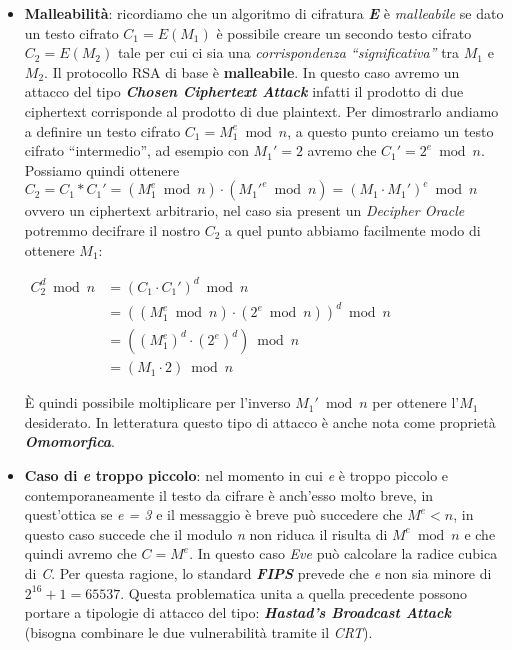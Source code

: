 \begin{itemize}
    
    \item \textbf{Malleabilità}: ricordiamo che un algoritmo di cifratura \textbf{\textit{E}} è \textit{malleabile} se dato un testo cifrato $C_1 = E(M_1)$ è possibile creare un secondo testo cifrato $C_2 = E(M_2)$ tale per cui ci sia una \textit{corrispondenza ``significativa''} tra $M_1$ e $M_2$. Il protocollo RSA di base è \textbf{malleabile}. In questo caso avremo un attacco del tipo \textbf{\textit{Chosen Ciphertext Attack}} infatti il prodotto di due ciphertext corrisponde al prodotto di due plaintext. Per dimostrarlo andiamo a definire un testo cifrato $C_1 = M_1^e \bmod n$, a questo punto creiamo un testo cifrato ``intermedio'', ad esempio con $M_1' = 2$ avremo che $C_1' = 2^e \bmod n$. Possiamo quindi ottenere $C_2 = C_1 * C_1' = (M_1^e \bmod n) \cdot (M_1'^e \bmod n) = (M_1 \cdot M_1')^e \bmod n$ ovvero un ciphertext arbitrario, nel caso sia present un \textit{Decipher Oracle} potremmo decifrare il nostro $C_2$ a quel punto abbiamo facilmente modo di ottenere $M_1$:
    \begin{center}
        \begin{math}
            \begin{aligned}
            C_2^d \bmod n &= (C_1 \cdot C_1')^d \bmod n \\
            &= ((M_1^e \bmod n) \cdot (2^e \bmod n))^d \bmod n \\
            &= ((M_1^e)^d \cdot (2^e)^d) \bmod n \\
            &= (M_1 \cdot 2) \bmod n
            \end{aligned}    
        \end{math}    
    \end{center}
    È quindi possibile moltiplicare per l'inverso $M_1' \bmod n$ per ottenere l'$M_1$ desiderato. In letteratura questo tipo di attacco è anche nota come proprietà \textbf{\textit{Omomorfica}}.

    \item \textbf{Caso di \textit{e} troppo piccolo}: nel momento in cui \textit{e} è troppo piccolo e contemporaneamente il testo da cifrare è anch'esso molto breve, in quest'ottica se \textit{e = 3} e il messaggio è breve può succedere che $M^e < n$, in questo caso succede che il modulo \textit{n} non riduca il risulta di $M^e \bmod n$ e che quindi avremo che $C = M^e$. In questo caso \textit{Eve} può calcolare la radice cubica di \textit{C}. Per questa ragione, lo standard \textbf{\textit{FIPS}} prevede che \textit{e} non sia minore di $2^{16} + 1 = 65537$. Questa problematica unita a quella precedente possono portare a tipologie di attacco del tipo: \textbf{\textit{Hastad's Broadcast Attack}} (bisogna combinare le due vulnerabilità tramite il \textit{CRT}).


\end{itemize}
